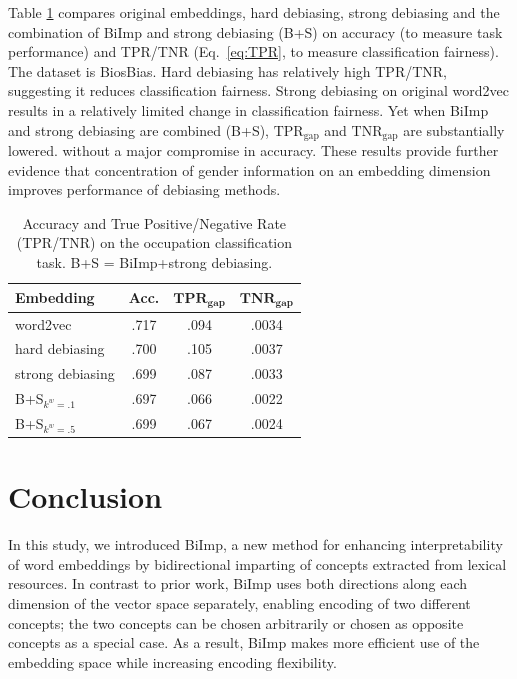 \documentclass[11pt,a4paper]{article}
\def\proposedmethod{BiImp}
\begin{document}

Table \ref{tab:biosbias} compares
original embeddings,
hard debiasing, strong
debiasing and the combination of \proposedmethod{} and
strong debiasing (B+S) on accuracy
(to measure task performance)
and TPR/TNR (Eq.\ \ref{eq:TPR}, to measure classification fairness).
The dataset is BiosBias.
Hard debiasing
has relatively high TPR/TNR, suggesting it
reduces classification fairness.
Strong debiasing 
on  original word2vec results in a relatively limited
change in classification fairness. Yet when
\proposedmethod{} and
strong debiasing are combined
(B+S),
$\text{TPR}_{\text{gap}}$ and $\text{TNR}_{\text{gap}}$
are substantially lowered.
without a major compromise in accuracy. These results
provide further evidence that concentration of gender
information on an embedding dimension improves performance
of debiasing methods.

\begin{table}
    \centering
	\begin{tabular}{lccc}
	    \hline \hline
        \textbf{Embedding} & \textbf{Acc.} & $\textbf{TPR}_{\textbf{gap}}$ & $\textbf{TNR}_{\textbf{gap}}$ \\\hline \hline %
        word2vec & .717 & .094 & .0034 \\
        hard debiasing & .700 & .105 & .0037 \\
        strong debiasing & .699 & .087 & .0033 \\
        B+S$_{k^w=.1}$ & .697 & .066 & .0022 \\
        B+S$_{k^w=.5}$ & .699 & .067 & .0024 \\
        \hline \hline
	\end{tabular}
	\caption{Accuracy and True Positive/Negative Rate
          (TPR/TNR) on the occupation classification
          task. B+S = \proposedmethod{}+strong debiasing.}
	\label{tab:biosbias}
\end{table}


\section{Conclusion} \label{sec:concl}

In this study, we introduced \proposedmethod{}, a new method for enhancing
interpretability of word embeddings by bidirectional
imparting of concepts extracted from lexical resources. 
In contrast to prior work, \proposedmethod{}
uses  both directions along each
dimension of the vector space separately, enabling encoding
of two different concepts; the two concepts can be chosen arbitrarily
or chosen as opposite concepts as a special case.  As a
result,
\proposedmethod{}
 makes more efficient use of
the embedding space while increasing encoding flexibility.
\end{document}
